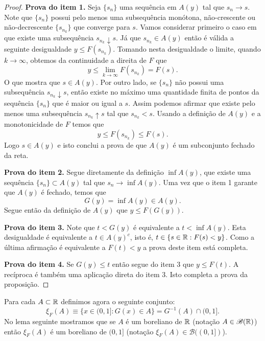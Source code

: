 \begin{proof}
	{\bf Prova do item 1.} 
	Seja $\{s_n\}$ uma sequência em $A(y)$ tal que $s_n\to s$. 
	Note que $\{s_n\}$ possui pelo menos uma subsequência 
	monótona, não-crescente ou não-decrescente $\{s_{n_{k}}\}$ 
	que converge para $s$. Vamos considerar primeiro o caso 
	em que existe uma subsequência $s_{n_k}\downarrow s$. 
	Já que $s_{n_k}\in A(y)$ então 
	é válida a seguinte desigualdade $y\leq F(s_{n_k})$.
	Tomando nesta desigualdade o limite, quando $k\to\infty$, 
	obtemos da continuidade a direita de $F$ que 
		\[ 
			y \leq 
			\lim_{k\to\infty} F(s_{n_k}) 
			= 
			F(s).
		\]
	O que mostra que $s\in A(y)$.
	Por outro lado, se $\{s_n\}$ não possui uma subsequência 
	$s_{n_k}\downarrow s$, então existe no máximo uma quantidade
	finita de pontos da sequência $\{s_n\}$ 
	que é maior ou igual a $s$.
	Assim podemos afirmar que existe pelo menos 
	uma subsequência $s_{n_k}\uparrow s$
	tal que $s_{n_k} < s$. Usando  
	a definição de $A(y)$ e a monotonicidade de $F$ 
	temos que 
		\[
			y\leq F(s_{n_k})\leq F(s).
		\]
	Logo $s\in A(y)$ e isto conclui a prova de que $A(y)$ é 
	um subconjunto fechado da reta.
	
	{\bf Prova do item 2.} Segue diretamente da definição $\inf A(y)$,
	que 	existe uma sequência $\{s_n\}\subset A(y)$ tal que $s_n\to \inf A(y)$.
	Uma vez que o item 1 garante que $A(y)$ é fechado, temos que 
		\[G(y)=\inf A(y) \in A(y).\]
	 Segue então da definição de $A(y)$ que $y\leq F(G(y))$.


	{\bf Prova do item 3.} Note que $t<G(y)$ é equivalente a
	$t<\inf A(y)$. Esta desigualdade é equivalente a 
	$t\in A(y)^c$, isto é, $t\in\{s\in\mathbb{R}: F(s)<y\}$. 
	Como a última afirmação é equivalente a $F(t)<y$ a
	prova deste item está completa.
	
	
	{\bf Prova do item 4.} Se $G(y)\leq t$ então 
	segue do item 3 que 	$y\leq F(t)$. A recíproca é 
	também uma aplicação direta do item 3.  
	Isto completa a prova da proposição.
\end{proof}

\bigskip

Para cada $A\subset \mathbb{R}$ definimos agora o seguinte conjunto:
	\begin{equation}\label{def-xi-F}
		\xi_F(A) \equiv \{ x\in (0,1]: G(x)\in A \} = G^{-1}(A)\cap (0,1].
	\end{equation}
No lema seguinte mostramos que se $A$ 
é um boreliano de $\mathbb{R}$ (notação $A\in\mathscr{B}(\mathbb{R})$)  
então 
$\xi_F(A)$ é um boreliano de $(0,1]$ 
(notação $\xi_F(A) \in\mathscr{B}((0,1])$).


